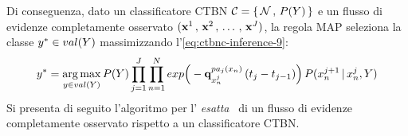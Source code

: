Di conseguenza, dato un classificatore \acs{CTBN} $\mathcal{C}=\{\,\mathcal{N}\,,\,P(\mathnormal{Y})\,\}$ e un flusso di evidenze completamente osservato $(\mathbf{x}^1\,,\,\mathbf{x}^2\,,\,\dotsc\,,\,\mathbf{x}^{J})$, la regola \acs{MAP} seleziona la classe $\mathnormal{y}^* \in val(\mathnormal{Y})$ massimizzando l'\autoref{eq:ctbnc-inference-9}:
\begin{equation}\label{eq:ctbnc-inference-10}
\mathnormal{y}^*= \operatorname*{arg\,max}_{\mathnormal{y}\in val(\mathnormal{Y})}P(\mathnormal{Y})\prod_{j=1}^{J}\prod_{n=1}^N exp\Big(-\boldsymbol{\textbf{\text{q}}}_{\mathnormal{x}_n^j}^{pa_j(\mathnormal{x}_n)}\,(t_j - t_{j-1})\Big)\,P(\mathnormal{x}_n^{j+1}\,\arrowvert\,\mathnormal{x}_n^j,\mathnormal{Y})
\end{equation}
Si presenta di seguito l'algoritmo per l'\emph{ esatta}~\citep{Stella2012} di un flusso di evidenze completamente osservato rispetto a un classificatore \acs{CTBN}.

